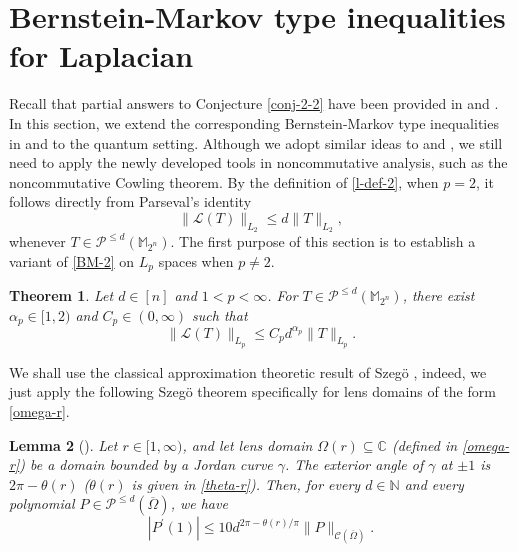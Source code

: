 \documentclass{amsbook}
\newtheorem{theorem}{Theorem}[chapter]
\newtheorem{lemma}[theorem]{Lemma}
\theoremstyle{definition}
\theoremstyle{remark}
\numberwithin{section}{chapter}
\numberwithin{equation}{chapter}
\newcommand{\1}{\mathbf{1}}
\begin{document}
\section{Bernstein-Markov type inequalities for Laplacian}
Recall that partial answers to Conjecture \ref{conj-2-2} have been provided in \cite{EI2020} and \cite{DDFKOSW2025}. In this section, we extend the corresponding Bernstein-Markov type inequalities in \cite{EI2020} and \cite{DDFKOSW2025} to the quantum setting. Although we adopt similar ideas to \cite{EI2020} and \cite{DDFKOSW2025}, we still need to apply the newly developed tools in noncommutative analysis, such as the noncommutative Cowling theorem. By the definition of \eqref{l-def-2}, when $p=2$, it follows directly from Parseval's identity
\begin{equation}\label{BM-2}
\|\mathcal{L}(T)\|_{L_{2}}\leq d\|T\|_{L_{2}},
\end{equation}
whenever $T\in \mathcal{P}^{\leq d}(\mathbb{M}_{2^n})$. 
The first purpose of this section is to establish a variant of \eqref{BM-2} on $L_p$ spaces when $p\neq 2$. 

\begin{theorem}\label{BM-d}
Let $d\in[n]$ and $1<p<\infty$. For  $T\in \mathcal{P}^{\leq d}(\mathbb{M}_{2^n})$,  there exist $\alpha_p \in[1,2)$ and $C_p \in(0, \infty)$ such that
$$
\|\mathcal{L} (T)\|_{L_{p}} \leq C_p d^{\alpha_p}\|T\|_{L_{p}}.
$$
\end{theorem}

We shall use the  classical approximation theoretic result of Szeg\"{o} \cite{S1925}, indeed, we just apply the following Szeg\"{o} theorem specifically for lens domains of the form \eqref{omega-r}. 

\begin{lemma}[{\cite[Proposition 15]{EI2020-JAT}}]\label{S-1} Let $r\in [1,\infty)$, and let lens domain $\Omega(r) \subseteq \mathbb{C}$ (defined in \eqref{omega-r}) be a domain bounded by a Jordan curve $\gamma$. The exterior angle of $\gamma$ at $\pm1$ is $2\pi-\theta(r)$ ($\theta(r)$ is given in \eqref{theta-r}). Then, 
for every $d \in \mathbb{N}$ and every polynomial $P\in \mathcal{P}^{\leq d}(\overline{\Omega})$, we have
$$
|P^{\prime}(1)| \leq 10 d^{2\pi-\theta(r) / \pi}\|P\|_{\mathcal{C}(\overline{\Omega})}.
$$
\end{lemma}
\end{document}
